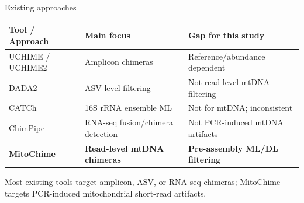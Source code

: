 \documentclass[aspectratio=169,11pt]{beamer}
\begin{document}

\begin{frame}{Existing approaches}

\scriptsize
\renewcommand{\arraystretch}{1.35}

\begin{table}
\centering
\begin{tabular}{p{} p{} p{}}
\hline
\textbf{Tool / Approach} & \textbf{Main focus} & \textbf{Gap for this study} \\
\hline
UCHIME / UCHIME2 &
Amplicon chimeras &
Reference/abundance dependent \\

DADA2 &
ASV-level filtering &
Not read-level mtDNA filtering \\

CATCh &
16S rRNA ensemble ML &
Not for mtDNA; inconsistent \\

ChimPipe &
RNA-seq fusion/chimera detection &
Not PCR-induced mtDNA artifacts \\

\textbf{MitoChime} &
\textbf{Read-level mtDNA chimeras} &
\textbf{Pre-assembly ML/DL filtering} \\
\hline
\end{tabular}
\end{table}

\vspace{0.5em}

\centering
\footnotesize
Most existing tools target amplicon, ASV, or RNA-seq chimeras; MitoChime targets PCR-induced mitochondrial short-read artifacts.

\end{frame}


\end{document}
